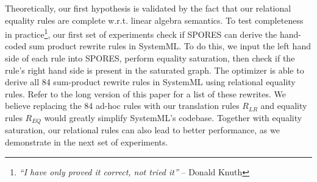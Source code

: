 Theoretically, our first hypothesis is validated by the fact that our relational
equality rules are complete w.r.t. linear algebra semantics. To test completeness in
practice\footnote{\textit{``I have only proved it correct, not tried it''} --
  Donald Knuth}, our first set of experiments check if SPORES
can derive the hand-coded sum product rewrite rules in SystemML. To do this, we
input the left hand side of each rule into SPORES, perform equality
saturation, then check if the rule's right hand side is present in the saturated
graph. The optimizer is able to derive
all 84 sum-product rewrite rules in SystemML using relational equality rules. 
Refer to the long version of this paper \cite{SPORESarxiv} for a list of these rewrites. 
We believe replacing the 84 ad-hoc
rules with our translation rules $R_{LR}$ and equality rules $R_{EQ}$ would greatly
simplify SystemML's codebase. Together with equality saturation, our relational
rules can also lead to better performance, as we demonstrate in the next set of
 experiments.



